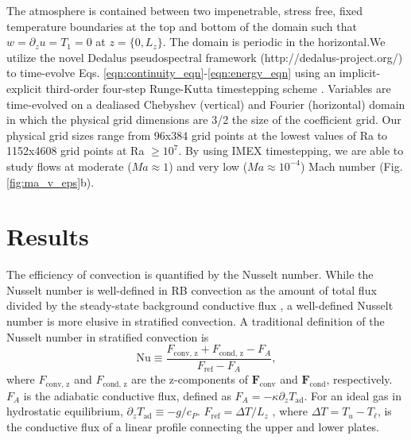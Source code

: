 \documentclass[aps, prl, twocolumn, groupedaddress, amsfonts, amssymb, amsmath]{revtex4-1}
\begin{document}
The atmosphere is contained between two impenetrable, stress free, fixed temperature boundaries at
the top and bottom of the domain such that $w = \partial_z u = T_1 = 0$ at $z = \{0, L_z\}$. The domain
is periodic in the horizontal.We utilize the novel Dedalus pseudospectral framework (http://dedalus-project.org/) to time-evolve Eqs. 
\ref{eqn:continuity_eqn}-\ref{eqn:energy_eqn} using an implicit-explicit third-order four-step 
Runge-Kutta timestepping scheme \cite{ascher&all1997}.  
Variables are time-evolved on a dealiased Chebyshev (vertical)
and Fourier (horizontal) domain in which the
physical grid dimensions are 3/2 the size of the coefficient grid.  Our physical grid sizes range from
96x384 grid points at the lowest values of Ra to 1152x4608 grid points at Ra $\geq 10^{7}$. 
By using IMEX timestepping, we are able to study flows at moderate ($Ma \approx 1$) and very low ($Ma \approx 10^{-4}$)
Mach number (Fig. \ref{fig:ma_v_eps}b).

\section{Results}
\label{sec:results}

The efficiency of convection is quantified by the Nusselt number.  
While the Nusselt number is well-defined in RB convection
as the amount of total flux divided by the steady-state background conductive flux 
\cite{johnston&doering2009, otero&all2002},
a well-defined Nusselt number is more elusive in stratified convection.  A traditional definition of the Nusselt
number in stratified convection is \cite{graham1975,hurlburt&all1984}
\begin{equation}
\text{Nu} \equiv \frac{F_{\text{conv, z}} + F_{\text{cond, z}} - F_A}{F_{\text{ref}} - F_A},
\label{eqn:nusselt}
\end{equation}
where $F_{\text{conv, z}}$ and $F_{\text{cond, z}}$ are the z-components of $\bm{F}_{\text{conv}}$ and $\bm{F}_{\text{cond}}$,
respectively.  $F_A$ is the adiabatic conductive flux, defined as $F_A = -\kappa \partial_z T_{\text{ad}}$.  For an
ideal gas in hydrostatic equilibrium, $\partial_z T_{\text{ad}} \equiv - g / c_{P}$.
$F_{\text{ref}} = \Delta T / L_z$ , where $\Delta T = T_{u} - T_{\ell}$, is the conductive flux of a linear profile connecting the upper
and lower plates.
\end{document}
